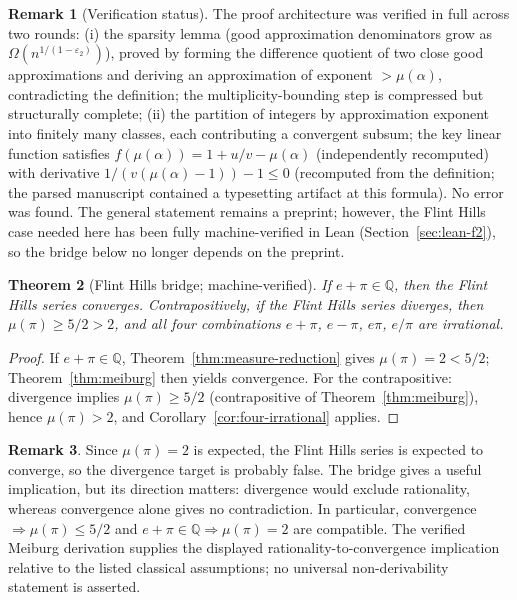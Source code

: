 \documentclass[11pt]{amsart}
\newtheorem{theorem}{Theorem}[section]
\theoremstyle{definition}
\newtheorem{remark}[theorem]{Remark}
\theoremstyle{remark}
\numberwithin{equation}{section}
\newcommand{\Q}{\mathbb{Q}}
\newcommand{\irr}{\mu}
\begin{document}
\begin{remark}[Verification status]
The proof architecture was verified in full across two rounds: (i) the sparsity lemma (good approximation denominators grow as $\Omega(n^{1/(1-\varepsilon_2)})$), proved by forming the difference quotient of two close good approximations and deriving an approximation of exponent $>\irr(\alpha)$, contradicting the definition; the multiplicity-bounding step is compressed but structurally complete; (ii) the partition of integers by approximation exponent into finitely many classes, each contributing a convergent subsum; the key linear function satisfies $f(\irr(\alpha))=1+u/v-\irr(\alpha)$ (independently recomputed) with derivative $1/(v(\irr(\alpha)-1))-1\le0$ (recomputed from the definition; the parsed manuscript contained a typesetting artifact at this formula). No error was found. The general statement remains a preprint; however, the Flint Hills case needed here has been fully machine-verified in Lean (Section~\ref{sec:lean-f2}), so the bridge below no longer depends on the preprint.
\end{remark}

\begin{theorem}[Flint Hills bridge; machine-verified]\label{thm:flint}
If $e+\pi\in\Q$, then the Flint Hills series converges. Contrapositively, if the Flint Hills series diverges, then $\irr(\pi)\ge5/2>2$, and all four combinations $e+\pi$, $e-\pi$, $e\pi$, $e/\pi$ are irrational.
\end{theorem}

\begin{proof}
If $e+\pi\in\Q$, Theorem~\ref{thm:measure-reduction} gives $\irr(\pi)=2<5/2$; Theorem~\ref{thm:meiburg} then yields convergence. For the contrapositive: divergence implies $\irr(\pi)\ge5/2$ (contrapositive of Theorem~\ref{thm:meiburg}), hence $\irr(\pi)>2$, and Corollary~\ref{cor:four-irrational} applies.
\end{proof}

\begin{remark}
Since $\irr(\pi)=2$ is expected, the Flint Hills series is expected to converge, so the divergence target is probably false. The bridge gives a useful implication, but its direction matters: divergence would exclude rationality, whereas convergence alone gives no contradiction. In particular, convergence $\Rightarrow\irr(\pi)\le5/2$ and $e+\pi\in\Q\Rightarrow\irr(\pi)=2$ are compatible. The verified Meiburg derivation supplies the displayed rationality-to-convergence implication relative to the listed classical assumptions; no universal non-derivability statement is asserted.
\end{remark}
\end{document}

